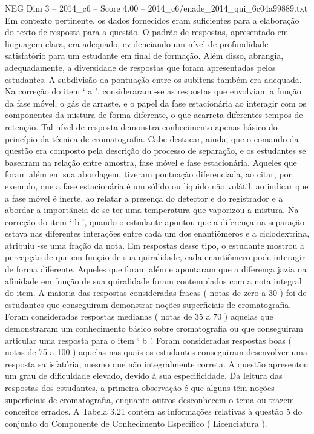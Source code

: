 \begin{textsample}{NEG Dim 3 – 2014\_c6 – Score 4.00 – 2014\_c6/enade\_2014\_qui\_6c04a99889.txt}
Em contexto pertinente, os dados fornecidos eram suficientes para a elaboração do texto de resposta para a questão.
O padrão de respostas, apresentado em linguagem clara, era adequado, evidenciando um nível de profundidade satisfatório para um estudante em final de formação.
Além disso, abrangia, adequadamente, a diversidade de respostas que foram apresentadas pelos estudantes.
A subdivisão da pontuação entre os subitens também era adequada.
Na correção do item ‘ a ’, consideraram -se as respostas que envolviam a função da fase móvel, o gás de arraste, e o papel da fase estacionária ao interagir com os componentes da mistura de forma diferente, o que acarreta diferentes tempos de retenção.
Tal nível de resposta demonstra conhecimento apenas básico do princípio da técnica de cromatografia.
Cabe destacar, ainda, que o comando da questão era composto pela descrição do processo de separação, e os estudantes se basearam na relação entre amostra, fase móvel e fase estacionária.
Aqueles que foram além em sua abordagem, tiveram pontuação diferenciada, ao citar, por exemplo, que a fase estacionária é um sólido ou líquido não volátil, ao indicar que a fase móvel é inerte, ao relatar a presença do detector e do registrador e a abordar a importância de se ter uma temperatura que vaporizou a mistura.
Na correção do item ‘ b ’, quando o estudante apontou que a diferença na separação estava nas diferentes interações entre cada um dos enantiômeros e a ciclodextrina, atribuiu -se uma fração da nota.
Em respostas desse tipo, o estudante mostrou a percepção de que em função de sua quiralidade, cada enantiômero pode interagir de forma diferente.
Aqueles que foram além e apontaram que a diferença jazia na afinidade em função de sua quiralidade foram contemplados com a nota integral do item.
A maioria das respostas consideradas fracas ( notas de zero a 30 ) foi de estudantes que conseguiram demonstrar noções superficiais de cromatografia.
Foram consideradas respostas medianas ( notas de 35 a 70 ) aquelas que demonstraram um conhecimento básico sobre cromatografia ou que conseguiram articular uma resposta para o item ‘ b ’.
Foram consideradas respostas boas ( notas de 75 a 100 ) aquelas nas quais os estudantes conseguiram desenvolver uma resposta satisfatória, mesmo que não integralmente correta.
A questão apresentou um grau de dificuldade elevado, devido à sua especificidade.
Da leitura das respostas dos estudantes, a primeira observação é que alguns têm noções superficiais de cromatografia, enquanto outros desconhecem o tema ou trazem conceitos errados.
A Tabela 3.21 contém as informações relativas à questão 5 do conjunto do Componente de Conhecimento Específico ( Licenciatura ).

\end{textsample}
